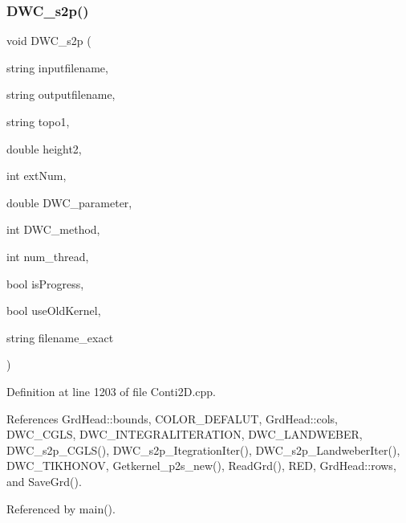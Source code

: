 \subsubsection{D\+W\+C\+\_\+s2p()}
{\footnotesize\ttfamily void D\+W\+C\+\_\+s2p (\begin{DoxyParamCaption}\item[{string}]{inputfilename,  }\item[{string}]{outputfilename,  }\item[{string}]{topo1,  }\item[{double}]{height2,  }\item[{int}]{ext\+Num,  }\item[{double}]{D\+W\+C\+\_\+parameter,  }\item[{int}]{D\+W\+C\+\_\+method,  }\item[{int}]{num\+\_\+thread,  }\item[{bool}]{is\+Progress,  }\item[{bool}]{use\+Old\+Kernel,  }\item[{string}]{filename\+\_\+exact }\end{DoxyParamCaption})}



Definition at line 1203 of file Conti2\+D.\+cpp.



References Grd\+Head\+::bounds, C\+O\+L\+O\+R\+\_\+\+D\+E\+F\+A\+L\+UT, Grd\+Head\+::cols, D\+W\+C\+\_\+\+C\+G\+LS, D\+W\+C\+\_\+\+I\+N\+T\+E\+G\+R\+A\+L\+I\+T\+E\+R\+A\+T\+I\+ON, D\+W\+C\+\_\+\+L\+A\+N\+D\+W\+E\+B\+ER, D\+W\+C\+\_\+s2p\+\_\+\+C\+G\+L\+S(), D\+W\+C\+\_\+s2p\+\_\+\+Itegration\+Iter(), D\+W\+C\+\_\+s2p\+\_\+\+Landweber\+Iter(), D\+W\+C\+\_\+\+T\+I\+K\+H\+O\+N\+OV, Getkernel\+\_\+p2s\+\_\+new(), Read\+Grd(), R\+ED, Grd\+Head\+::rows, and Save\+Grd().



Referenced by main().

